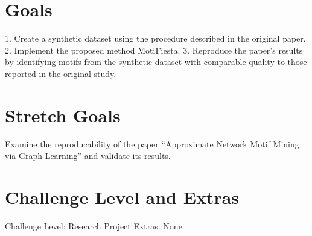 \documentclass{article}
\begin{document}
\section{Goals}
1. Create a synthetic dataset using the procedure described in the original paper.
2. Implement the proposed method MotiFiesta.
3. Reproduce the paper's results by identifying motifs from the synthetic dataset with comparable quality to those reported in the original study.

\section{Stretch Goals}
Examine the reproducability of the paper “Approximate Network Motif Mining via Graph Learning” and validate its results.
\section{Challenge Level and Extras}
Challenge Level: Research Project
Extras: None
\end{document}

